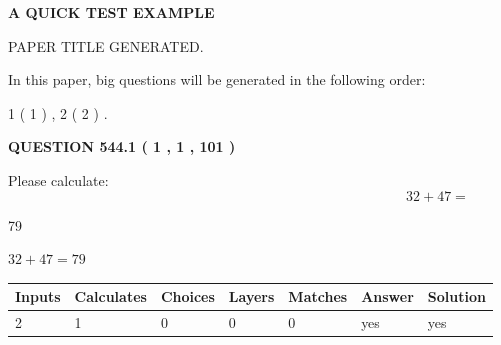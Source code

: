 \documentclass[12pt]{article}
\begin{document}
   
   
   
   
   
 \vspace{0.2in}
{\LARGE {\textbf{ A QUICK TEST EXAMPLE}}}
   
   
 PAPER TITLE GENERATED.
   
   
   
\vspace{0.2in}
   
In this paper, big questions will be generated in the following order: 
   
   
   1 ( 1 )
 ,
   2 ( 2 )
 .
  
\vspace{0.2in}
  
{\textbf{\Large{QUESTION
544.1 
 ( 1 , 1 , 101 )
}}}
  
  
 
Please calculate:
\begin{equation}
32 +  %
47 = \nonumber
\end{equation}
 
 
 
\noindent{}
 
 

79
 
 
\noindent{}
 
 

 
 
 
\noindent{}
 
 

$ %
32 +  %
47=   %
79$
 
 
\noindent{}
 
 

 
   
   
   
   
\noindent\begin{tabular}{|l|l|l|l|l|l|l|}
 \hline
Inputs & Calculates & Choices & Layers & Matches & Answer & Solution \\ \hline
 2  & 
 1  & 
 0
  & 
 0  & 
 0  & 
  yes & 
  yes 
  \\ \hline
 \end{tabular}
   
   
   
\end{document}

